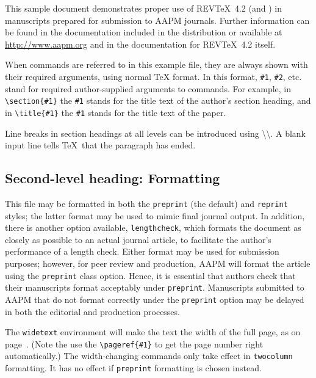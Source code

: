 \documentclass[%
 aapm,
 mph,%
 amsmath,amssymb,
 reprint,%
]{revtex4-2}
\begin{document}
This sample document demonstrates proper use of REV\TeX~4.2 (and
\LaTeXe) in manuscripts prepared for submission to AAPM
journals. Further information can be found in the documentation included in the distribution or available at
\url{http://www.aapm.org} and in the documentation for 
REV\TeX~4.2 itself.

When commands are referred to in this example file, they are always
shown with their required arguments, using normal \TeX{} format. In
this format, \verb+#1+, \verb+#2+, etc. stand for required
author-supplied arguments to commands. For example, in
\verb+\section{#1}+ the \verb+#1+ stands for the title text of the
author's section heading, and in \verb+\title{#1}+ the \verb+#1+
stands for the title text of the paper.

Line breaks in section headings at all levels can be introduced using
\textbackslash\textbackslash. A blank input line tells \TeX\ that the
paragraph has ended. 

\subsection{\label{sec:level2}Second-level heading: Formatting}

This file may be formatted in both the \texttt{preprint} (the default) and
\texttt{reprint} styles; the latter format may be used to 
mimic final journal output. In addition, there is another
option available, \texttt{lengthcheck}, which formats the document as closely
as possible to an actual journal article, to facilitate the author's
performance of a length check. Either format may be used for submission
purposes; however, for peer review and production, AAPM will format the
article using the \texttt{preprint} class option. Hence, it is
essential that authors check that their manuscripts format acceptably
under \texttt{preprint}. Manuscripts submitted to AAPM that do not
format correctly under the \texttt{preprint} option may be delayed in
both the editorial and production processes.

The \texttt{widetext} environment will make the text the width of the
full page, as on page~\pageref{eq:wideeq}. (Note the use the
\verb+\pageref{#1}+ to get the page number right automatically.) The
width-changing commands only take effect in \texttt{twocolumn}
formatting. It has no effect if \texttt{preprint} formatting is chosen
instead.
\end{document}
